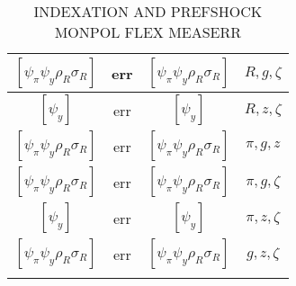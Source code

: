 \documentclass[a4paper,10pt]{article}
\begin{document}
\begin{longtable}{|c|c|c|c|}
\hline
$[\psi_\pi \psi_y \rho_R \sigma_R ]$ & err & $[\psi_\pi \psi_y \rho_R \sigma_R ]$ & ${R},{g},{\zeta}$ \\
\hline
$[\psi_y ]$ & err & $[\psi_y ]$ & ${R},{z},{\zeta}$ \\
\hline
$[\psi_\pi \psi_y \rho_R \sigma_R ]$ & err & $[\psi_\pi \psi_y \rho_R \sigma_R ]$ & ${\pi},{g},{z}$ \\
\hline
$[\psi_\pi \psi_y \rho_R \sigma_R ]$ & err & $[\psi_\pi \psi_y \rho_R \sigma_R ]$ & ${\pi},{g},{\zeta}$ \\
\hline
$[\psi_y ]$ & err & $[\psi_y ]$ & ${\pi},{z},{\zeta}$ \\
\hline
$[\psi_\pi \psi_y \rho_R \sigma_R ]$ & err & $[\psi_\pi \psi_y \rho_R \sigma_R ]$ & ${g},{z},{\zeta}$ \\
\hline
\caption{INDEXATION AND PREFSHOCK MONPOL FLEX MEASERR}
\label{table:MyTableLabel}
\end{longtable}
\end{document}

